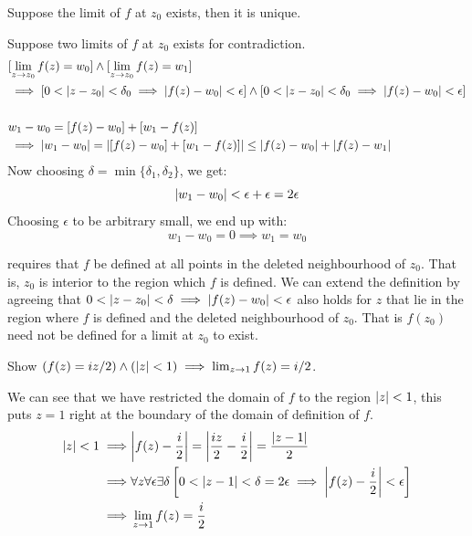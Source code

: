 \documentclass[12pt, english]{book}
\makeatletter
\renewenvironment{proof}[1][\proofname]{\par
	\pushQED{\qed}%
	\normalfont \topsep6\p@\@plus6\p@\relax
	\list{}{%
		\settowidth{\leftmargin}{\itshape\proofname:\hskip\labelsep}%
		\setlength{\labelwidth}{0pt}%
		\setlength{\itemindent}{-\leftmargin}%
		}%
	\item[\hskip\labelsep\itshape#1\@addpunct{:}]\ignorespaces
	}{\popQED\endlist\@endpefalse}
\makeatother
\begin{document}
	\begin{theorem} 
		\label{Uniqueness of Limits Theorem - Complex}
		Suppose the limit of $f$ at $z_0$ exists, then it is unique.
	\end{theorem}
	\begin{proof}
		Suppose two limits of $f$ at $z_0$ exists for contradiction.
		\begin{align*}
			&[\lim_{z \rightarrow z_0} f(z) = w_0] \land [\lim_{z \rightarrow z_0} f(z) = w_1] \\
			&\implies [0 < \abs{z - z_0} < \delta_0 \implies \abs{f(z) - w_0} < \epsilon] 
				\land [0 < \abs{z - z_0} < \delta_0 \implies \abs{f(z) - w_0} < \epsilon] \\
			\\
			&w_1 - w_0 = [f(z) - w_0] + [w_1 - f(z)]\\
			&\implies \abs{w_1 - w_0} = \abs{[f(z) - w_0] + [w_1 - f(z)]} 
				\leq \abs{f(z) - w_0} + \abs{f(z) - w_1} 
		\end{align*}
		Now choosing $\delta = \min\{\delta_1, \delta_2\}$, we get:
		$$\abs{w_1 - w_0} < \epsilon + \epsilon = 2 \epsilon$$
		Choosing $\epsilon$ to be arbitrary small, we end up with: 
		$$w_1 - w_0 = 0 \implies w_1 = w_0$$
	\end{proof}

	 requires that $f$ be defined at all points in the deleted neighbourhood of $z_0$. That is, $z_0$ is interior to the region which $f$ is defined. We can extend the definition by agreeing that $0<\abs{z-z_0} < \delta \implies \abs{f(z) - w_0} < \epsilon$ also holds for $z$ that lie in the region where $f$ is defined and the deleted neighbourhood of $z_0$.  That is $f(z_0)$ need not be defined for a limit at $z_0$ to exist.
	
	\begin{example}
		Show $(f(z) = iz/2) \land (\abs{z} < 1) \implies \lim_{z\rightarrow 1} f(z) = i/2$.
		
		We can see that we have restricted the domain of $f$ to the region $\abs{z} < 1$, this puts $z = 1$ right at the boundary of the domain of definition of $f$.
		\begin{align*}
			\abs{z} < 1 \implies& \abs{f(z) - \frac{i}{2}} = \abs{\frac{iz}{2} - \frac{i}{2}} = \frac{\abs{z - 1}}{2} \\
			\implies& \forall z \forall \epsilon \exists \delta \left[ 0 < \abs{z - 1} < \delta = 2\epsilon \implies \abs{f(z) - \frac{i}{2}} < \epsilon \right] \\
			\implies& \lim_{z \rightarrow 1} f(z) = \frac{i}{2}
		\end{align*}
	\end{example}
	
\end{document}
